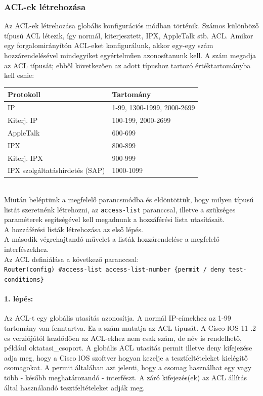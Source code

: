 \subsubsection{ACL-ek létrehozása}
Az ACL-ek létrehozása globális konfigurációs módban történik.
Számos különböző típusú ACL létezik, így normál, kiterjesztett, IPX, AppleTalk stb. ACL.
Amikor egy forgalomirányítón ACL-eket konfigurálunk, akkor egy-egy szám
hozzárendelésével mindegyiket egyértelműen azonosítanunk kell. A szám megadja az ACL
típusát; ebből következően az adott típushoz tartozó értéktartományba kell esnie:\\
\begin{tabular}{l|l}
	\hline 
	\rule[-1ex]{0pt}{2.5ex} Protokoll & Tartomány \\ 
	\hline 
	\rule[-1ex]{0pt}{2.5ex} IP & 1-99, 1300-1999, 2000-2699 \\ 
	\hline 
	\rule[-1ex]{0pt}{2.5ex} Kiterj. IP & 100-199, 2000-2699 \\ 
	\hline 
	\rule[-1ex]{0pt}{2.5ex} AppleTalk & 600-699 \\ 
	\hline 
	\rule[-1ex]{0pt}{2.5ex} IPX & 800-899 \\ 
	\hline 
	\rule[-1ex]{0pt}{2.5ex} Kiterj. IPX & 900-999 \\ 
	\hline 
	\rule[-1ex]{0pt}{2.5ex} IPX szolgáltatáshirdetés (SAP) & 1000-1099 \\ 
	\hline 
\end{tabular}\\

Miután beléptünk a megfelelő parancsmódba és eldöntöttük, hogy milyen típusú listát
szeretnénk létrehozni, az \verb|access-list| paranccsal, illetve a szükséges paraméterek segítségével
kell megadnunk a hozzáférési lista utasításait.\\
A hozzáférési listák létrehozása az első lépés.\\
A második végrehajtandó művelet a listák hozzárendelése a megfelelő interfészekhez.\\

Az ACL definiálása a következő paranccsal:\\
\verb|Router(config) #access-list access-list-number {permit / deny test-conditions}|

\paragraph{1. lépés:} Az ACL-t egy globális utasítás azonosítja. A normál IP-címekhez az 1-99 tartomány van
fenntartva. Ez a szám mutatja az ACL típusát. A Cisco lOS 11 .2-es verziójától kezdődően az
ACL-ekhez nem csak szám, de név is rendelhető, például oktatasi\_csoport. A globális ACL
utasítás permit illetve deny kifejezése adja meg, hogy a Cisco lOS szoftver hogyan kezelje a
tesztfeltételeket kielégítő csomagokat. A permit általában azt jelenti, hogy a csomag
használhat egy vagy több - később meghatározandó - interfészt. A záró kifejezés(ek) az ACL
állítás által használandó tesztfeltételeket adják meg.

